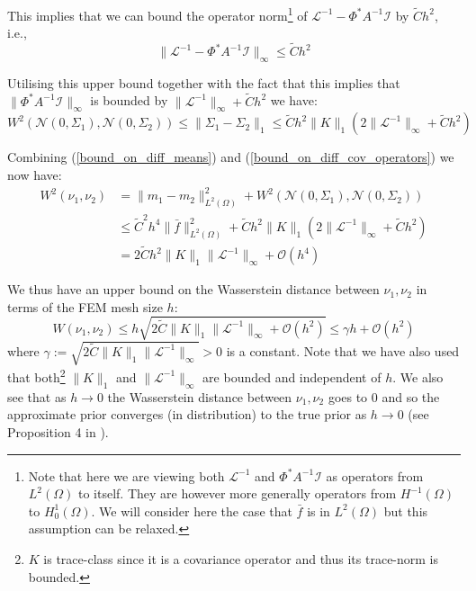 This implies that we can bound the operator norm\footnote{Note that here we are viewing both $\mathcal{L}^{-1}$ and $\Phi^{*}A^{-1}\mathcal{I}$ as operators from $L^{2}(\Omega)$ to itself. They are however more generally operators from $H^{-1}(\Omega)$ to $H^{1}_{0}(\Omega)$. We will consider here the case that $\bar{f}$ is in $L^{2}(\Omega)$ but this assumption can be relaxed.} of $\mathcal{L}^{-1}-\Phi^{*}A^{-1}\mathcal{I}$ by $\tilde{C}h^{2}$, i.e.,
\begin{equation}
    \label{bound_on_diff_of_solution_operators}
    \|\mathcal{L}^{-1}-\Phi^{*}A^{-1}\mathcal{I}\|_{\infty}\leq \tilde{C}h^{2}
\end{equation}

Utilising this upper bound together with the fact that this implies that $\|\Phi^{*}A^{-1}\mathcal{I}\|_{\infty}$ is bounded by $\|\mathcal{L}^{-1}\|_{\infty}+\tilde{C}h^2$ we have:
\begin{equation}
    \label{bound_on_diff_cov_operators}
    W^{2}(\mathcal{N}(0,\Sigma_1),\mathcal{N}(0,\Sigma_2))\leq\|\Sigma_{1}-\Sigma_{2}\|_{1}\leq \tilde{C}h^{2}\|K\|_{1}\left(2\|\mathcal{L}^{-1}\|_{\infty}+\tilde{C}h^2\right)
\end{equation}

Combining (\ref{bound_on_diff_means}) and (\ref{bound_on_diff_cov_operators}) we now have:
\begin{align*}
    W^{2}(\nu_{1},\nu_{2})&=\|m_1-m_2\|_{L^{2}(\Omega)}^{2}+W^{2}(\mathcal{N}(0,\Sigma_1),\mathcal{N}(0,\Sigma_2)) \\
    &\leq \tilde{C}^{2}h^4\|\bar{f}\|^{2}_{L^{2}(\Omega)}+ \tilde{C}h^{2}\|K\|_{1}\left(2\|\mathcal{L}^{-1}\|_{\infty}+\tilde{C}h^2\right) \\
    &=2\tilde{C}h^{2}\|K\|_{1}\|\mathcal{L}^{-1}\|_{\infty}+\mathcal{O}(h^4)
\end{align*}

We thus have an upper bound on the Wasserstein distance between $\nu_{1},\nu_{2}$ in terms of the FEM mesh size $h$:
\begin{equation}
    W(\nu_{1},\nu_{2})\leq h \sqrt{2\tilde{C}\|K\|_{1}\|\mathcal{L}^{-1}\|_{\infty}+\mathcal{O}(h^2)}\leq \gamma h +\mathcal{O}(h^2)
\end{equation}
where $\gamma:=\sqrt{2\tilde{C}\|K\|_{1}\|\mathcal{L}^{-1}\|_{\infty}}>0$ is a constant. Note that we have also used that both\footnote{$K$ is trace-class since it is a covariance operator and thus its trace-norm is bounded.} $\|K\|_{1}$ and $\|\mathcal{L}^{-1}\|_{\infty}$ are bounded and independent of $h$. We also see that as $h\rightarrow 0$ the Wasserstein distance between $\nu_1,\nu_2$ goes to 0 and so the approximate prior converges (in distribution) to the true prior as $h\rightarrow 0$ (see Proposition 4 in \textcolor{blue}{\cite{masarotto2019procrustes}}).
\qedsymbol

